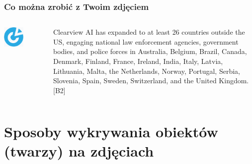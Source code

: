 \documentclass{beamer}
\begin{document}
            \begin{frame}
                \begin{center}
                    \frametitle{Co można zrobić z Twoim zdjęciem}
                    \begin{columns}
                        \begin{column}{0.5\textwidth}
                            \begin{center}
                                \includegraphics[width=0.5\textwidth]{pictures/clearview_ai.png}
                            \end{center}
                        \end{column}
                        \begin{column}{0.5\textwidth}
                            Clearview AI has expanded to at least 26 countries outside the US, engaging national law enforcement agencies, government bodies, and police forces in Australia, Belgium, Brazil, Canada, Denmark, Finland, France, Ireland, India, Italy, Latvia, Lithuania, Malta, the Netherlands, Norway, Portugal, Serbia, Slovenia, Spain, Sweden, Switzerland, and the United Kingdom. [B2]
                        \end{column}
                    \end{columns}
                \end{center}
            \end{frame}

    \section{Sposoby wykrywania obiektów (twarzy) na zdjęciach}
        
\end{document}
